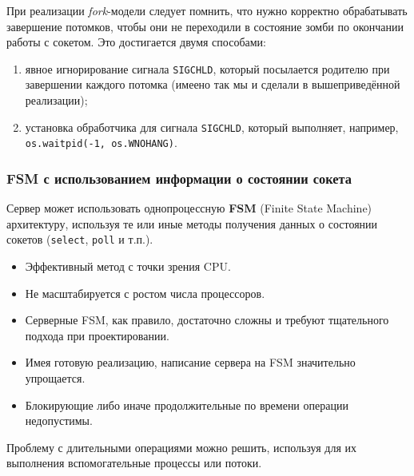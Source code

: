 При реализации \emph{fork}-модели следует помнить, что нужно корректно обрабатывать завершение потомков, чтобы они не переходили в состояние зомби по окончании работы с сокетом. Это достигается двумя способами:
\begin{enumerate}
  \item явное игнорирование сигнала \lstinline{SIGCHLD}, который посылается родителю при завершении каждого потомка (имеено так мы и сделали в вышеприведённой реализации);
  \item установка обработчика для сигнала \lstinline{SIGCHLD}, который выполняет, например, \lstinline{os.waitpid(-1, os.WNOHANG)}.
\end{enumerate}

\subsubsection{FSM с использованием информации о состоянии сокета}
Сервер может использовать однопроцессную \textbf{FSM} (Finite State Machine) архитектуру, используя те или иные методы получения данных о состоянии сокетов (\lstinline{select}, \lstinline{poll} и т.п.).
\begin{itemize}
  \item[\Checkmark] Эффективный метод с точки зрения CPU.
  \item[\XSolidBrush] Не масштабируется с ростом числа процессоров.
  \item[\XSolidBrush] Серверные FSM, как правило, достаточно сложны и требуют тщательного подхода при проектировании.
  \item[\Checkmark] Имея готовую реализацию, написание сервера на FSM значительно упрощается.
  \item[\XSolidBrush] Блокирующие либо иначе продолжительные по времени операции недопустимы.
\end{itemize}

Проблему с длительными операциями можно решить, используя для их выполнения вспомогательные процессы или потоки.

